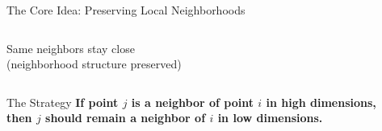 \documentclass[10pt]{beamer}
\begin{document}
\begin{frame}{The Core Idea: Preserving Local Neighborhoods}
\begin{columns}
\begin{column}{0.5\textwidth}

\vspace{0.15cm}
Same neighbors stay close\\
(neighborhood structure preserved)

\end{column}
\end{columns}

\vspace{0.3cm}

\begin{block}{The Strategy}
\centering
\textbf{If point $j$ is a neighbor of point $i$ in high dimensions,}\\
\textbf{then $j$ should remain a neighbor of $i$ in low dimensions.}
\end{block}

\end{frame}
\end{document}
